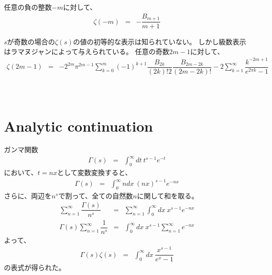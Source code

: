 \documentclass[uplatex,a4j,12pt,dvipdfmx]{jsarticle}
\begin{document}
任意の負の整数$-m$に対して、
\begin{eqnarray}
	\zeta(-m)
	&=&
	-
	\dfrac{B_{m+1}}{m+1}
\end{eqnarray}

$s$が奇数の場合の$\zeta(s)$の値の初等的な表示は知られていない。
しかし級数表示はラマヌジャンによって与えられている。
任意の奇数$2m-1$に対して、
\begin{eqnarray}
	\zeta(2m-1)
	&=&
	-
	2^{2m} \pi^{2m-1}
	\sum_{k=0}^{m}
	(-1)^{k+1}
	\dfrac{B_{2k}}{(2k)!2}
	\dfrac{B_{2m-2k}}{(2m-2k)!}
	-
	2
	\sum_{k=1}^{\infty}
	\dfrac{ k^{-2m+1} }{ e^{2 \pi k} - 1 }
\end{eqnarray}

${}$

${}$

${}$

\section{Analytic continuation}

ガンマ関数
\begin{eqnarray}
	\Gamma(s)
	&=&
	\int^{\infty}_{0}
	\!\! dt
	\ \! t^{s-1} e^{-t}
\end{eqnarray}
において、$t=nx$として変数変換すると、
\begin{eqnarray}
	\Gamma(s)
	&=&
	\int^{\infty}_{0}
	\!\! ndx
	\ \! (nx)^{s-1} e^{-nx}
	\label{eqn:1302120225hayonena}
\end{eqnarray}
さらに、両辺を$n^{s}$で割って、全ての自然数$n$に関して和を取る。
\begin{eqnarray}
	\sum_{n=1}^{\infty}
	\dfrac{ \Gamma(s) }{ n^{s} }
	&=&
	\sum_{n=1}^{\infty}
	\int^{\infty}_{0}
	\!\! dx
	\ \! x^{s-1} e^{-nx}
	\nonumber \\
	\Gamma(s)
	\sum_{n=1}^{\infty}
	\dfrac{ 1 }{ n^{s} }
	&=&
	\int^{\infty}_{0}
	\!\! dx
	\ \! x^{s-1}
	\sum_{n=1}^{\infty}
	e^{-nx}
\end{eqnarray}
よって、
\begin{eqnarray}
	\Gamma(s)
	\zeta(s)
	&=&
	\int^{\infty}_{0}
	\!\! dx
	\ \!
	\dfrac{x^{s-1}}{e^{x} - 1}
	\label{eqn:1302120248nerana}
\end{eqnarray}
の表式が得られた。
\end{document}
